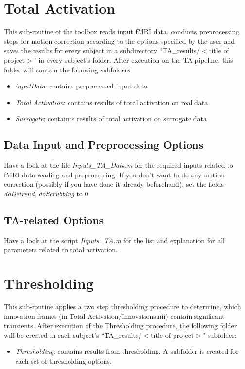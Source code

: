 \documentclass{article}
\begin{document}
\section{Total Activation}
This sub-routine of the toolbox reads input fMRI data, conducts preprocessing steps for motion correction according to the options specified by the user and saves the results for every subject in a subdirectory ``TA\_results/$<$title of project$>$" in every subject's folder. After execution on the TA pipeline, this folder will contain the  following subfolders:
\begin{itemize}
\item \textit{inputData}: contains preprocessed input data
\item \textit{Total Activation}: contains results of total activation on real data
\item \textit{Surrogate}: containts results of total activation on surrogate data
\end{itemize}

\subsection{Data Input and Preprocessing Options}
Have a look at the file \textit{Inputs\_TA\_Data.m} for the required inputs related to fMRI data reading and preprocessing. If you don't want to do any motion correction (possibly if you have done it already beforehand), set the fields \textit{doDetrend}, \textit{doScrubbing} to 0.

\subsection{TA-related Options}
Have a look at the script \textit{Inputs\_TA.m} for the list and explanation for all parameters related to total activation.


\section{Thresholding}
This sub-routine applies a two step thresholding procedure to determine, which innovation frames (in Total Activation/Innovations.nii) contain significant transients. After execution of the Thresholding procedure, the following folder will be created in each subject's ``TA\_results/$<$title of project$>$" subfolder:
\begin{itemize}
\item \textit{Thresholding}: contains results from thresholding. A subfolder is created for each set of thresholding options.
\end{itemize}
\end{document}
